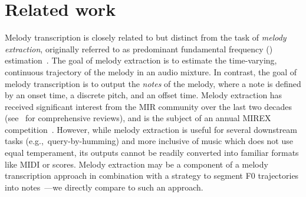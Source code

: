 \section{Related work}\label{sec:related}

Melody transcription is closely related to but distinct from the task of \emph{melody extraction}, originally referred to as predominant fundamental frequency (\fnot) estimation~\cite{goto1999real,goto2004real}. 
The goal of melody extraction is to estimate the time-varying, continuous \fnot{} trajectory of the melody in an audio mixture. 
In contrast, the goal of melody transcription is to output the \emph{notes} of the melody, where a note is defined by an onset time, a discrete pitch, and an offset time. 
Melody extraction has received significant interest from the MIR community over the last two decades (see~\cite{salamon2014melody,rao2022melody} for comprehensive reviews), 
and is the subject of an annual MIREX competition~\cite{downie2014ten}. 
However, 
while melody extraction is useful for several downstream tasks (e.g.,~query-by-humming) and more inclusive of music which does not use equal temperament, 
its outputs cannot be readily converted into familiar formats like MIDI or scores. 
Melody extraction may be a component of a melody transcription approach in combination with a strategy to segment F0 trajectories into notes~\cite{salamon2015midi,nishikimi2016musical,nishikimi2017scale}---we directly compare to such an approach.

